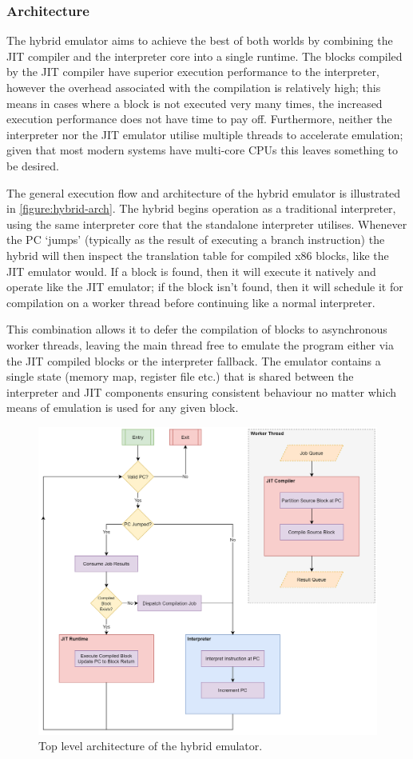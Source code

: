 \subsubsection{Architecture}
\label{section:hybrid-arch}

The hybrid emulator aims to achieve the best of both worlds by combining the JIT compiler and the interpreter core into a single runtime. The blocks compiled by the JIT compiler have superior execution performance to the interpreter, however the overhead associated with the compilation is relatively high; this means in cases where a block is not executed very many times, the increased execution performance does not have time to pay off. Furthermore, neither the interpreter nor the JIT emulator utilise multiple threads to accelerate emulation; given that most modern systems have multi-core CPUs this leaves something to be desired.

The general execution flow and architecture of the hybrid emulator is illustrated in \autoref{figure:hybrid-arch}. The hybrid begins operation as a traditional interpreter, using the same interpreter core that the standalone interpreter utilises. Whenever the PC `jumps' (typically as the result of executing a branch instruction) the hybrid will then inspect the translation table for compiled x86 blocks, like the JIT emulator would. If a block is found, then it will execute it natively and operate like the JIT emulator; if the block isn't found, then it will schedule it for compilation on a worker thread before continuing like a normal interpreter.

This combination allows it to defer the compilation of blocks to asynchronous worker threads, leaving the main thread free to emulate the program either via the JIT compiled blocks or the interpreter fallback. The emulator contains a single state (memory map, register file etc.) that is shared between the interpreter and JIT components ensuring consistent behaviour no matter which means of emulation is used for any given block.

\begin{figure}[h]
    \centering
    \includegraphics[width=1\linewidth]{diagrams/hybrid.png}
    \caption{Top level architecture of the hybrid emulator.}
    \label{figure:hybrid-arch}
\end{figure}